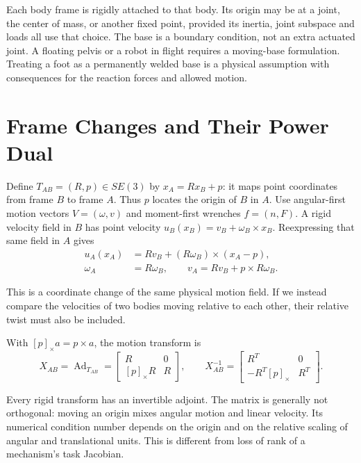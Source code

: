 Each body frame is rigidly attached to that body. Its origin may be at a joint, the center of mass, or another fixed point, provided its inertia, joint subspace and loads all use that choice. The base is a boundary condition, not an extra actuated joint. A floating pelvis or a robot in flight requires a moving-base formulation. Treating a foot as a permanently welded base is a physical assumption with consequences for the reaction forces and allowed motion.

\section{Frame Changes and Their Power Dual}
\label{sec:adjoint}

Define $T_{AB}=(R,p)\in SE(3)$ by $x_A=Rx_B+p$: it maps point coordinates from frame $B$ to frame $A$. Thus $p$ locates the origin of $B$ in $A$. Use angular-first motion vectors $V=(\omega,v)$ and moment-first wrenches $f=(n,F)$. A rigid velocity field in $B$ has point velocity $u_B(x_B)=v_B+\omega_B\times x_B$. Reexpressing that same field in $A$ gives
\begin{equation}
 \begin{aligned}
 u_A(x_A)&=R v_B+(R\omega_B)\times(x_A-p),\\
 \omega_A&=R\omega_B,\qquad v_A=Rv_B+p\times R\omega_B.
 \end{aligned}
 \label{eq:adjoint_velocity}
\end{equation}

This is a coordinate change of the same physical motion field. If we instead compare the velocities of two bodies moving relative to each other, their relative twist must also be included.

With $[p]_\times a=p\times a$, the motion transform is
\begin{equation}
 X_{AB}=\operatorname{Ad}_{T_{AB}}
 =\begin{bmatrix}R&0\\{}[p]_\times R&R\end{bmatrix},\qquad
 X_{AB}^{-1}=\begin{bmatrix}R^T&0\\-R^T[p]_\times&R^T\end{bmatrix}.
 \label{eq:adjoint_matrix}
\end{equation}

Every rigid transform has an invertible adjoint. The matrix is generally not orthogonal: moving an origin mixes angular motion and linear velocity. Its numerical condition number depends on the origin and on the relative scaling of angular and translational units. This is different from loss of rank of a mechanism's task Jacobian.

